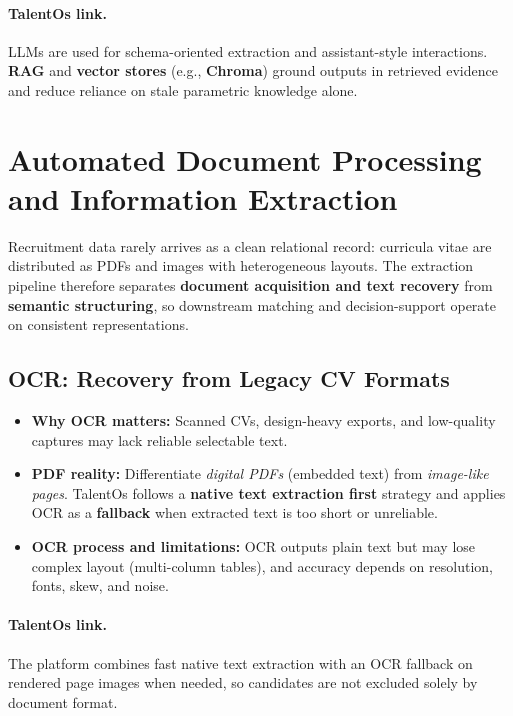 \paragraph{TalentOs link.}
LLMs are used for schema-oriented extraction and assistant-style interactions. \textbf{RAG} and \textbf{vector stores} (e.g., \textbf{Chroma}) ground outputs in retrieved evidence and reduce reliance on stale parametric knowledge alone.

\section{Automated Document Processing and Information Extraction}
\label{sec:ch4:document_processing}

Recruitment data rarely arrives as a clean relational record: curricula vitae are distributed as PDFs and images with heterogeneous layouts. The extraction pipeline therefore separates \textbf{document acquisition and text recovery} from \textbf{semantic structuring}, so downstream matching and decision-support operate on consistent representations.

\subsection{OCR: Recovery from Legacy CV Formats}
\label{sec:ch4:ocr}

\begin{itemize}
    \item \textbf{Why OCR matters:} Scanned CVs, design-heavy exports, and low-quality captures may lack reliable selectable text.
    \item \textbf{PDF reality:} Differentiate \textit{digital PDFs} (embedded text) from \textit{image-like pages}. TalentOs follows a \textbf{native text extraction first} strategy and applies OCR as a \textbf{fallback} when extracted text is too short or unreliable.
    \item \textbf{OCR process and limitations:} OCR outputs plain text but may lose complex layout (multi-column tables), and accuracy depends on resolution, fonts, skew, and noise.
\end{itemize}

\paragraph{TalentOs link.}
The platform combines fast native text extraction with an OCR fallback on rendered page images when needed, so candidates are not excluded solely by document format.

